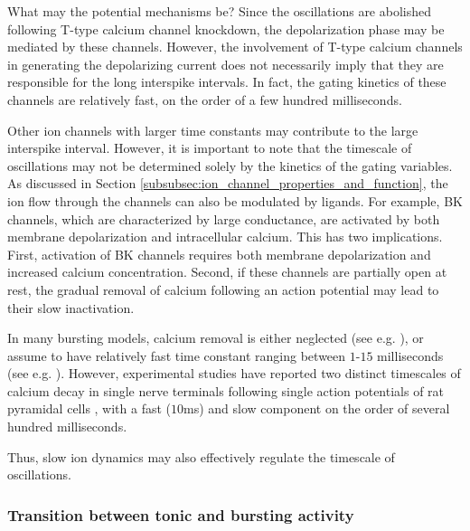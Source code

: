 \documentclass[../main.tex]{subfiles}
\begin{document}
What may the potential mechanisms be? Since the oscillations are abolished following T-type calcium channel knockdown, the depolarization phase may be mediated by these channels. However, the involvement of T-type calcium channels in generating the depolarizing current does not necessarily imply that they are responsible for the long interspike intervals. In fact, the gating kinetics of these channels are relatively fast, on the order of a few hundred milliseconds.

Other ion channels with larger time constants may contribute to the large interspike interval. However, it is important to note that the timescale of oscillations may not be determined solely by the kinetics of the gating variables. As discussed in Section \ref{subsubsec:ion_channel_properties_and_function}, the ion flow through the channels can also be modulated by ligands. For example, BK channels, which are characterized by large conductance, are activated by both membrane depolarization and intracellular calcium. This has two implications. First, activation of BK channels requires both membrane depolarization and increased calcium concentration. Second, if these channels are partially open at rest, the gradual removal of calcium following an action potential may lead to their slow inactivation.

In many bursting models, calcium removal is either neglected (see e.g. \parencite{wangMultipleDynamicalModes1994,amarilloInterplaySevenSubthreshold2014}), or assume to have relatively fast time constant ranging between $1$-$15$ milliseconds (see e.g. \parencite{mccormickModelElectrophysiologicalProperties1992,golombContributionPersistentNa2006,alonsoVisualizationCurrentsNeural2019,parkMathematicalModelSubthalamic2021}). However, experimental studies have reported two distinct timescales of calcium decay in single nerve terminals following single action potentials of rat pyramidal cells \parencite{koesterCalciumDynamicsAssociated2000}, with a fast ($10$ms) and slow component on the order of several hundred milliseconds.

Thus, slow ion dynamics may also effectively regulate the timescale of oscillations. 


\subsubsection{Transition between tonic and bursting activity} \label{subsubsec:transit_tonic_burst}
\end{document}
